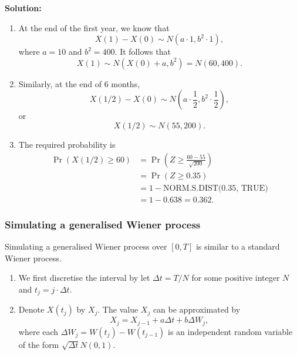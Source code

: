 \documentclass[landscape, 20pt]{extreport}
\theoremstyle{definition}
\theoremstyle{definition}
\theoremstyle{definition}
\theoremstyle{definition}
\theoremstyle{remark}
\begin{document}
\textbf{Solution:}

\begin{enumerate}
\def\labelenumi{\arabic{enumi}.}
\item
  At the end of the first year, we know that
  \[X(1) - X(0) \sim N(a \cdot 1, b^2 \cdot 1),\] where \(a = 10\) and
  \(b^2 = 400\). It follows that
  \[X(1) \sim N(X(0) + a , b^2 ) = N(60, 400).\]
\item
  Similarly, at the end of 6 months,
  \[X(1/2) - X(0) \sim N(a \cdot \frac{1}{2}, b^2 \cdot \frac{1}{2}),\]
  or \[X(1/2) \sim N(55,200).\]
\item
  The required probability is \[\begin{aligned}
          \Pr( X(1/2) \ge 60) &= \Pr( Z \ge \frac{60 - 55}{\sqrt{200}}  )\\
          &= \Pr(Z \ge 0.35) \\
          &= 1 - \text{NORM.S.DIST(0.35, TRUE)} \\
          &= 1 - 0.638 = 0.362.
      \end{aligned}\]
\end{enumerate}

\hypertarget{simulating-a-generalised-wiener-process}{%
\subsubsection{Simulating a generalised Wiener process}\label{simulating-a-generalised-wiener-process}}

Simulating a generalised Wiener process over \([0,T]\) is similar to a
standard Wiener process.

\begin{enumerate}
\def\labelenumi{\arabic{enumi}.}
\item
  We first discretise the interval by let \(\Delta t = T/N\) for some
  positive integer \(N\) and \(t_j = j \cdot \Delta t\).
\item
  Denote \(X(t_j)\) by \(X_j\). The value \(X_j\) can be approximated by
  \[X_j = X_{j-1} + a \Delta t + b \Delta W_j,\] where each
  \(\Delta W_j = W(t_j) - W(t_{j-1})\) is an independent random
  variable of the form \(\sqrt{\Delta t} N(0,1)\).
\end{enumerate}
\end{document}
